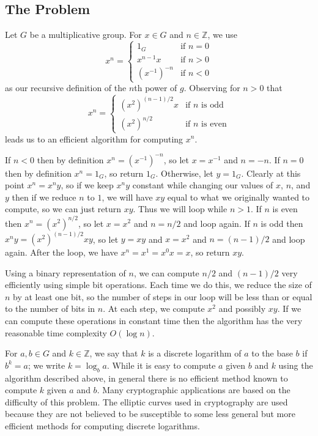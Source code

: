 \documentclass[12pt]{article}
\newcommand*\Z{\mathbb{Z}}
\begin{document}
\subsection{The Problem}

Let $G$ be a multiplicative group. For $x \in G$ and $n \in \Z$, we use
\[
  x^n = \begin{cases}
    1_G & \text{if $n = 0$} \\
    x^{n - 1}x & \text{if $n > 0$} \\
    (x^{-1})^{-n} & \text{if $n < 0$}
  \end{cases}
\]
as our recursive definition of the $n$th power of $g$. Observing for $n > 0$
that
\[
  x^n = \begin{cases}
    (x^2)^{(n - 1)/2}x & \text{if $n$ is odd} \\
    (x^2)^{n/2} & \text{if $n$ is even}
  \end{cases}
\]
leads us to an efficient algorithm for computing $x^n$.

If $n < 0$ then by definition $x^n = (x^{-1})^{-n}$, so let $x = x^{-1}$ and $n
= -n$. If $n = 0$ then by definition $x^n = 1_G$, so return $1_G$. Otherwise,
let $y = 1_G$. Clearly at this point $x^n = x^ny$, so if we keep $x^ny$ constant
while changing our values of $x$, $n$, and $y$ then if we reduce $n$ to $1$, we
will have $xy$ equal to what we originally wanted to compute, so we can just
return $xy$. Thus we will loop while $n > 1$. If $n$ is even then $x^n =
(x^2)^{n/2}$, so let $x = x^2$ and $n = n/2$ and loop again. If $n$ is odd then
$x^ny = (x^2)^{(n - 1)/2}xy$, so let $y = xy$ and $x = x^2$ and $n = (n - 1)/2$
and loop again. After the loop, we have $x^n = x^1 = x^0x = x$, so return $xy$.

Using a binary representation of $n$, we can compute $n/2$ and $(n - 1)/2$ very
efficiently using simple bit operations. Each time we do this, we reduce the
size of $n$ by at least one bit, so the number of steps in our loop will be less
than or equal to the number of bits in $n$. At each step, we compute $x^2$ and
possibly $xy$. If we can compute these operations in constant time then the
algorithm has the very reasonable time complexity $O(\log n)$.

For $a, b \in G$ and $k \in \Z$, we say that $k$ is a discrete logarithm of $a$
to the base $b$ if $b^k = a$; we write $k = \log_b a$. While it is easy to
compute $a$ given $b$ and $k$ using the algorithm described above, in general
there is no efficient method known to compute $k$ given $a$ and $b$. Many
cryptographic applications are based on the difficulty of this problem. The
elliptic curves used in cryptography are used because they are not believed to
be susceptible to some less general but more efficient methods for computing
discrete logarithms.
\end{document}
